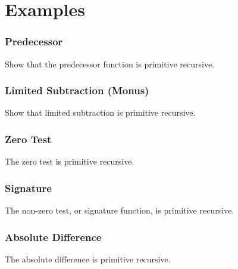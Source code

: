 \documentclass{beamer}
\theoremstyle{indentDefn} \newtheorem{defn}[]{Definition}
\begin{document}
\section{Examples}

\begin{frame}
	\frametitle{Predecessor}

	Show that the predecessor function is primitive recursive.

	\vspace{7cm}


\end{frame}

\begin{frame}
	\frametitle{Limited Subtraction (Monus)}

	Show that limited subtraction is primitive recursive. 

	\vspace{7cm}


\end{frame}

\begin{frame}
	\frametitle{Zero Test}

	The zero test is primitive recursive. 

	\vspace{7cm}


\end{frame}

\begin{frame}
	\frametitle{Signature}

	The non-zero test, or signature function, is primitive recursive. 

	\vspace{7cm}



\end{frame}

\begin{frame}
	\frametitle{Absolute Difference}

	The absolute difference is primitive recursive. 

	\vspace{7cm}



\end{frame}
\end{document}
